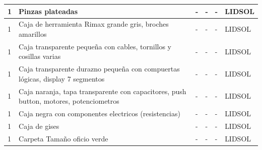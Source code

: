 \documentclass[a4paper,11pt]{article}                 %
\begin{document}
\begin{longtable}{|p{}|p{}|p{}|p{}|p{}|p{}|}
1                          & Pinzas plateadas                                                                      & -                                                                            & -                        & -                                           & LIDSOL                        \\ \hline
1                          & Caja de herramienta Rimax grande gris, broches amarillos                              & -                                                                            & -                        & -                                           & LIDSOL                        \\ \hline
1                          & Caja transparente pequeña con cables, tornillos y cosillas varias                     & -                                                                            & -                        & -                                           & LIDSOL                        \\ \hline
1                          & Caja transparente durazno pequeña con compuertas lógicas, display 7 segmentos         & -                                                                            & -                        & -                                           & LIDSOL                        \\ \hline
1                          & Caja naranja, tapa transparente con capacitores, push button, motores, potenciometros & -                                                                            & -                        & -                                           & LIDSOL                        \\ \hline
1                          & Caja negra con componentes electricos (resistencias)                                  & -                                                                            & -                        & -                                           & LIDSOL                        \\ \hline
1                          & Caja de gises                                                                         & -                                                                            & -                        & -                                           & LIDSOL                        \\ \hline
1                          & Carpeta Tamaño oficio verde                                                           & -                                                                            & -                        & -                                           & LIDSOL                        \\ \hline

\end{longtable}
\end{document}
